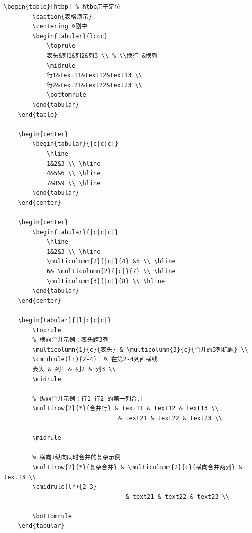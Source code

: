 \documentclass{ctexart}
\begin{document}
\begin{lstlisting}[language={[LaTeX]TeX}]
    \begin{table}[htbp] % htbp用于定位
        \caption{表格演示}
        \centering %剧中
        \begin{tabular}{lccc}
            \toprule
            表头&列1&列2&列3 \\ % \\换行 &换列
            \midrule
            行1&text11&text12&text13 \\
            行2&text21&text22&text23 \\ 
            \bottomrule
        \end{tabular}        
    \end{table}
    
    \begin{center}
        \begin{tabular}{|c|c|c|}
            \hline
            1&2&3 \\ \hline
            4&5&6 \\ \hline
            7&8&9 \\ \hline
        \end{tabular}
    \end{center}
    
    \begin{center}
        \begin{tabular}{|c|c|c|}
            \hline
            1&2&3 \\ \hline
            \multicolumn{2}{|c|}{4} &5 \\ \hline
            6& \multicolumn{2}{|c|}{7} \\ \hline
            \multicolumn{3}{|c|}{8} \\ \hline
        \end{tabular}
    \end{center}

    \begin{tabular}{|l|c|c|c|}
        \toprule
        % 横向合并示例：表头跨3列
        \multicolumn{1}{c}{表头} & \multicolumn{3}{c}{合并的3列标题} \\
        \cmidrule(lr){2-4}  % 在第2-4列画横线
        表头 & 列1 & 列2 & 列3 \\
        \midrule
        
        % 纵向合并示例：行1-行2 的第一列合并
        \multirow{2}{*}{合并行} & text11 & text12 & text13 \\
                                & text21 & text22 & text23 \\
        
        \midrule
        
        % 横向+纵向同时合并的复杂示例
        \multirow{2}{*}{复杂合并} & \multicolumn{2}{c}{横向合并两列} & text13 \\
        \cmidrule(lr){2-3}
                                  & text21 & text22 & text23 \\
        
        \bottomrule
    \end{tabular}


\end{lstlisting}
\end{document}
